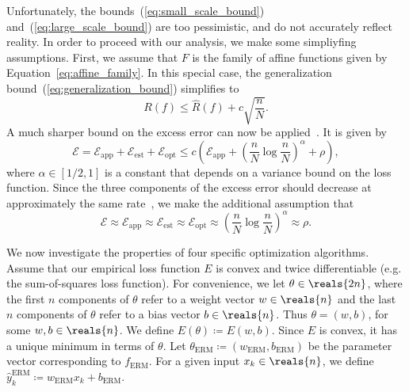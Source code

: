 \documentclass[11pt,a4paper]{article}
\numberwithin{equation}{section}
\newcommand{\apperr}{\mathcal{E}_{\mathrm{app}}}
\newcommand{\esterr}{\mathcal{E}_{\mathrm{est}}}
\newcommand{\opterr}{\mathcal{E}_{\mathrm{opt}}}
\begin{document}
Unfortunately, the bounds~(\ref{eq:small_scale_bound})
and~(\ref{eq:large_scale_bound}) are too pessimistic, and do not accurately
reflect reality. In order to proceed with our analysis, we make some simpliyfing
assumptions. First, we assume that $F$ is the family of affine functions given
by Equation~\ref{eq:affine_family}. In this special case, the generalization
bound~(\ref{eq:generalization_bound}) simplifies to
\[
	R(f) \leq \hat{R}(f) + c \sqrt{\frac{n}{N}}.
\]
A much sharper bound on the excess error can now be
applied~\citep{bousquet2008tradeoffs}. It is given by
\[
	\mathcal{E}
	= \apperr + \esterr + \opterr
	\leq c \left( \apperr + \left(\frac{n}{N}\log\frac{n}{N}\right)^\alpha +
		\rho \right),
\]
where $\alpha \in [1/2, 1]$ is a constant that depends on a variance bound on
the loss function. Since the three components of the excess error should
decrease at approximately the same rate~\citep{bousquet2008tradeoffs}, we make
the additional assumption that
\[
	\mathcal{E} \approx \apperr \approx \esterr \approx \opterr \approx
		\left(\frac{n}{N}\log\frac{n}{N}\right)^\alpha \approx \rho.
\]

We now investigate the properties of four specific optimization algorithms.
Assume that our empirical loss function $E$ is convex and twice differentiable
(e.g. the sum-of-squares loss function). For convenience, we let $\theta \in
\reals{2n}$, where the first $n$ components of $\theta$ refer to a weight vector
$w \in \reals{n}$ and the last $n$ components of $\theta$ refer to a bias vector
$b \in \reals{n}$. Thus $\theta = (w, b)$, for some $w, b \in \reals{n}$. We
define $E(\theta) \coloneqq E(w, b)$. Since $E$ is convex, it has a unique
minimum in terms of $\theta$. Let $\theta_{\text{ERM}} \coloneqq
(w_{\text{ERM}}, b_{\text{ERM}})$ be the parameter vector corresponding to
$f_{\text{ERM}}$. For a given input $x_k \in \reals{n}$, we define
$\hat{y}_k^{\text{ERM}} \coloneqq w_{\text{ERM}} x_k + b_{\text{ERM}}$.
\end{document}
